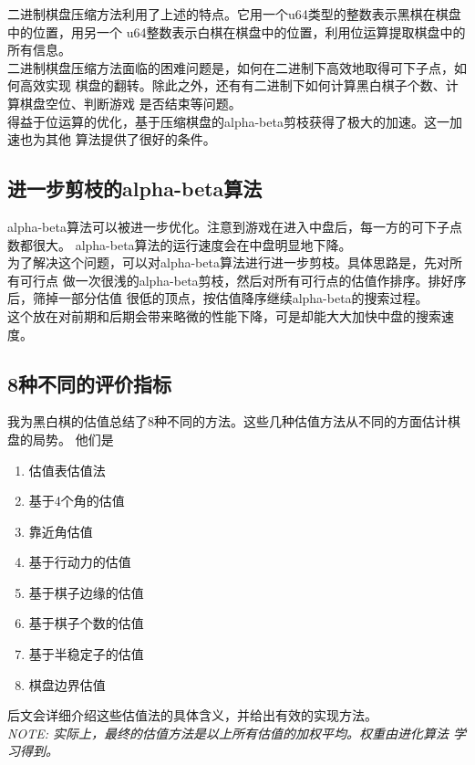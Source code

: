 \documentclass[a4paper]{article}
\begin{document}
二进制棋盘压缩方法利用了上述的特点。它用一个u64类型的整数表示黑棋在棋盘中的位置，用另一个
u64整数表示白棋在棋盘中的位置，利用位运算提取棋盘中的所有信息。\\

二进制棋盘压缩方法面临的困难问题是，如何在二进制下高效地取得可下子点，如何高效实现
棋盘的翻转。除此之外，还有有二进制下如何计算黑白棋子个数、计算棋盘空位、判断游戏
是否结束等问题。\\

得益于位运算的优化，基于压缩棋盘的alpha-beta剪枝获得了极大的加速。这一加速也为其他
算法提供了很好的条件。
\subsection{进一步剪枝的alpha-beta算法}
alpha-beta算法可以被进一步优化。注意到游戏在进入中盘后，每一方的可下子点数都很大。
alpha-beta算法的运行速度会在中盘明显地下降。\\

为了解决这个问题，可以对alpha-beta算法进行进一步剪枝。具体思路是，先对所有可行点
做一次很浅的alpha-beta剪枝，然后对所有可行点的估值作排序。排好序后，筛掉一部分估值
很低的顶点，按估值降序继续alpha-beta的搜索过程。\\

这个放在对前期和后期会带来略微的性能下降，可是却能大大加快中盘的搜索速度。
\subsection{8种不同的评价指标}
我为黑白棋的估值总结了8种不同的方法。这些几种估值方法从不同的方面估计棋盘的局势。
他们是
\begin{enumerate}
    \item 估值表估值法
    \item 基于4个角的估值
    \item 靠近角估值
    \item 基于行动力的估值
    \item 基于棋子边缘的估值
    \item 基于棋子个数的估值
    \item 基于半稳定子的估值
    \item 棋盘边界估值
\end{enumerate}
后文会详细介绍这些估值法的具体含义，并给出有效的实现方法。\\

\emph{NOTE: 实际上，最终的估值方法是以上所有估值的加权平均。权重由进化算法
学习得到。} \\
\end{document}
